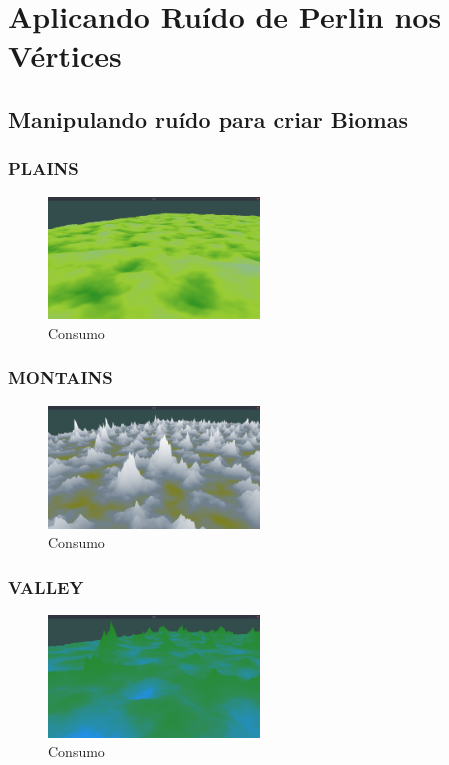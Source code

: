 \section{Aplicando Ruído de Perlin nos Vértices}

\subsection{Manipulando ruído para criar Biomas}
\subsubsection{PLAINS}

\begin{figure}[H]
    \centering
    \includegraphics[width=0.5\textwidth]{figuras/bssPlains.png}
    \caption{Consumo}
    \label{fig:bssPlains}
\end{figure}

\subsubsection{MONTAINS}


\begin{figure}[H]
    \centering
    \includegraphics[width=0.5\textwidth]{figuras/bssMontains.png}
    \caption{Consumo}
    \label{fig:bssMontains}
\end{figure}

\subsubsection{VALLEY}


\begin{figure}[H]
    \centering
    \includegraphics[width=0.5\textwidth]{figuras/bssValley.png}
    \caption{Consumo}
    \label{fig:bssValley}
\end{figure}

